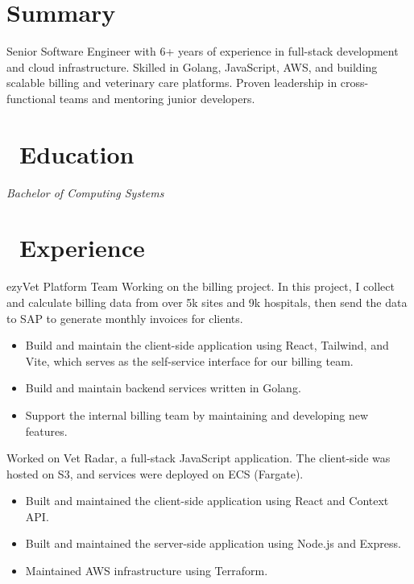\documentclass{resume}
\begin{document}



\section*{Summary}
Senior Software Engineer with 6+ years of experience in full-stack development and cloud infrastructure. Skilled in Golang, JavaScript, AWS, and building scalable billing and veterinary care platforms. Proven leadership in cross-functional teams and mentoring junior developers.

\section{\faGraduationCap\ Education}
\textit{Bachelor of Computing Systems}

\section{\faUsers\ Experience}
\role{Senior Software Engineer} {ezyVet Platform Team}
Working on the billing project. In this project, I collect and calculate billing data from over 5k sites and 9k hospitals, then send the data to SAP to generate monthly invoices for clients.
\begin{itemize}
  \item Build and maintain the client-side application using React, Tailwind, and Vite, which serves as the self-service interface for our billing team.
  \item Build and maintain backend services written in Golang.
  \item Support the internal billing team by maintaining and developing new features.
\end{itemize}

Worked on Vet Radar, a full-stack JavaScript application. The client-side was hosted on S3, and services were deployed on ECS (Fargate).
\begin{itemize}
  \item Built and maintained the client-side application using React and Context API.
  \item Built and maintained the server-side application using Node.js and Express.
  \item Maintained AWS infrastructure using Terraform.
\end{itemize}
\end{document}

